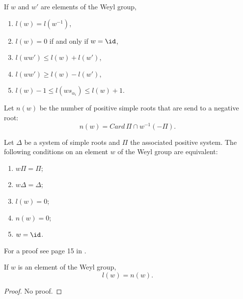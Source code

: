 \begin{lemma}
    If \( w\) and \( w'\) are elements of the Weyl group,
    \begin{enumerate}
        \item
            \( l(w)=l(w^{-1})\),
        \item
            \( l(w)=0\) if and only if \( w=\id\),
        \item
            \( l(ww')\leq l(w)+l(w')\),
        \item
            \( l(ww')\geq l(w)-l(w')\),
        \item
            \( l(w)-1\leq l(ws_{\alpha_i})\leq l(w)+1\).
    \end{enumerate}
\end{lemma}
Let \( n(w)\) be the number of positive simple roots that are send to a negative root:
\begin{equation}
    n(w)=Card\,\Pi\cap w^{-1}(-\Pi).
\end{equation}

\begin{proposition}
    Let \( \Delta\) be a system of simple roots and \( \Pi\) the associated positive system. The following conditions on an element \( w\) of the Weyl group are equivalent:
    \begin{enumerate}
        \item
            \( w\Pi=\Pi\);
        \item
            \( w\Delta=\Delta\);
        \item
            \( l(w)=0\);
        \item
            \( n(w)=0\);
        \item
            \( w=\id\).
    \end{enumerate}
\end{proposition}

For a proof see page 15 in \cite{HumphreysCoxeter}.

\begin{theorem}
    If \( w\) is an element of the Weyl group,
    \begin{equation}
        l(w)=n(w).
    \end{equation}
\end{theorem}

\begin{proof}
    No proof.
\end{proof}

